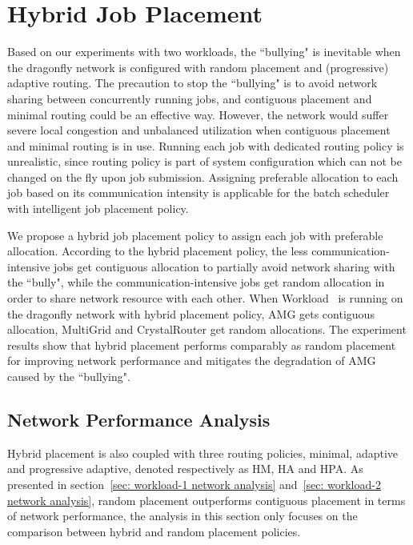 \section{Hybrid Job Placement}
\label{sec: hybrid placement}

Based on our experiments with two workloads, the ``bullying" is inevitable when the dragonfly network is configured with random placement and (progressive) adaptive routing. 
The precaution to stop the ``bullying" is to avoid network sharing between concurrently running jobs, 
and contiguous placement and minimal routing could be an effective way. 
However, the network would suffer severe local congestion and unbalanced utilization when contiguous placement and minimal routing is in use. 
Running each job with dedicated routing policy is unrealistic, 
since routing policy is part of system configuration which can not be changed on the fly upon job submission. 
Assigning preferable allocation to each job based on its communication intensity is applicable for the batch scheduler with intelligent job placement policy. 



We propose a hybrid job placement policy to assign each job with preferable allocation. 
According to the hybrid placement policy, 
the less communication-intensive jobs get contiguous allocation to partially avoid network sharing with the ``bully", 
while the communication-intensive jobs get random allocation in order to share network resource with each other. 
When Workload~ is running on the dragonfly network with hybrid placement policy, 
AMG gets contiguous allocation, MultiGrid and CrystalRouter get random allocations. 
The experiment results show that hybrid placement performs comparably as random placement for improving network performance and mitigates the degradation of AMG caused by the ``bullying".



\subsection{Network Performance Analysis}

Hybrid placement is also coupled with three routing policies, minimal, adaptive and progressive adaptive, denoted respectively as HM, HA and HPA. As presented in section~\ref{sec: workload-1 network analysis} and~\ref{sec: workload-2 network analysis}, random placement outperforms contiguous placement in terms of network performance, the analysis in this section only focuses on the comparison between hybrid and random placement policies. 

